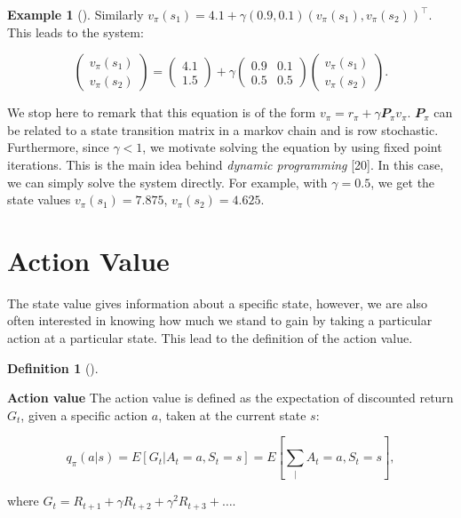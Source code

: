 \documentclass[
  letterpaper,
]{report}
\theoremstyle{plain}
\theoremstyle{definition}
\newtheorem{example}{Example}[chapter]
\theoremstyle{definition}
\newtheorem{definition}{Definition}[chapter]
\theoremstyle{remark}
\begin{document}
\begin{example}[]
Similarly
\(v_\pi(s_1) = 4.1 + \gamma(0.9,0.1)(v_\pi(s_1),v_\pi(s_2))^\intercal\).
This leads to the system:

\[
\begin{pmatrix}
v_\pi(s_1)\\
v_\pi(s_2)
\end{pmatrix} = \begin{pmatrix}
4.1\\
1.5
\end{pmatrix} + \gamma \begin{pmatrix}
0.9 & 0.1\\
0.5 & 0.5
\end{pmatrix}\begin{pmatrix}
v_\pi(s_1)\\
v_\pi(s_2)
\end{pmatrix}.
\]

We stop here to remark that this equation is of the form
\(v_\pi = r_\pi + \gamma \mathbfit{P}_\pi v_\pi\). \(\mathbfit{P}_\pi\)
can be related to a state transition matrix in a markov chain and is row
stochastic. Furthermore, since \(\gamma<1\), we motivate solving the
equation by using fixed point iterations. This is the main idea behind
\emph{dynamic programming} {[}20{]}. In this case, we can simply solve
the system directly. For example, with \(\gamma=0.5\), we get the state
values \(v_\pi(s_1) = 7.875\), \(v_\pi(s_2) = 4.625\).

\end{example}

\hypertarget{action-value}{%
\section{Action Value}\label{action-value}}

The state value gives information about a specific state, however, we
are also often interested in knowing how much we stand to gain by taking
a particular action at a particular state. This lead to the definition
of the action value.

\leavevmode{}%
\begin{definition}[]\label{def-action_value}

\textbf{Action value} The action value is defined as the expectation of
discounted return \(G_t\), given a specific action \(a\), taken at the
current state \(s\):

\[
q_\pi(a|s) = E\left[G_t|A_t=a,S_t=s\right] = E\left[\sum_|A_t=a,S_t=s\right],
\]

where \(G_t = R_{t+1} + \gamma R_{t+2} + \gamma^2R_{t+3} + \dots\).

\end{definition}
\end{document}
